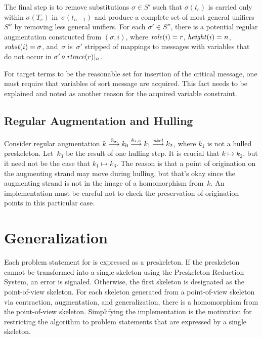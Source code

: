 \documentclass[12pt]{article}
\theoremstyle{definition}
\newenvironment{note}{\itshape\par\noindent}{}
\begin{document}
The final step is to remove substitutions $\sigma\in S'$ such that
$\sigma(t_c)$ is carried only within $\sigma(T_e)$
in~$\sigma(t_{n-1})$ and produce a complete set of most general
unifiers~$S''$ by removing less general unifiers.  For each
$\sigma'\in S''$,
there is a potential regular augmentation constructed from
$(\sigma,i)$, where $\operatorname{\mathit{role}}(i)=r$, $\operatorname{\mathit{height}}(i)=n$,
$\operatorname{\mathit{subst}}(i)=\sigma$, and~$\sigma$ is~$\sigma'$ stripped of
mappings to messages with variables that do not occur in
$\sigma'\circ\operatorname{\mathit{rtrace}}(r)|_{n}$.

\begin{note}
For target terms to be the reasonable set for insertion of the
critical message, one must require that variables of sort message are
acquired.  This fact needs to be explained and noted as another reason
for the acquired variable constraint.
\end{note}

\subsection{Regular Augmentation and Hulling}

Consider regular augmentation
$k\stackrel{\mathbb S_\sigma}{\longrightarrow}k_0\stackrel{\mathbb A_{i,n}}{\longrightarrow}k_1
\stackrel{\operatorname{\mathit{skel}}}{\longrightarrow}k_2$, where $k_1$ is not a hulled preskeleton.
Let~$k_3$ be the result of one hulling step.  It is crucial that
$k\longmapsto k_2$, but it need not be the case that $k_1\longmapsto
k_3$.  The reason is that a point of origination on the augmenting
strand may move during hulling, but that's okay since the augmenting
strand is not in the image of a homomorphism from~$k$.  An
implementation must be careful not to check the preservation of
origination points in this particular case.

\section{Generalization}\label{generalization}

Each problem statement for {\cpsa} is expressed as a preskeleton.  If
the preskeleton cannot be transformed into a single skeleton using the
Preskeleton Reduction System, an error is signaled.  Otherwise, the
first skeleton is designated as the point-of-view skeleton.  For each skeleton generated from a
point-of-view skeleton via contraction, augmentation, and
generalization, there is a homomorphism from the point-of-view
skeleton.  Simplifying the implementation is the motivation for
restricting the algorithm to problem statements that are expressed by
a single skeleton.
\end{document}
